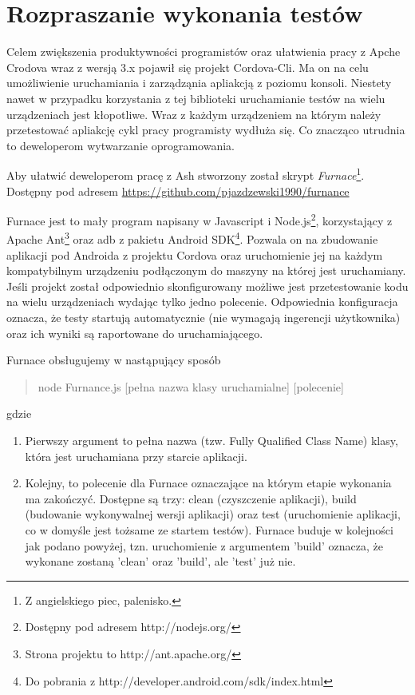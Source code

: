 \documentclass[brudnopis]{xmgr}
\begin{document}
\section{Rozpraszanie wykonania testów}

Celem zwiększenia produktywności programistów oraz ułatwienia pracy z Apche Crodova wraz z wersją 3.x pojawił się projekt Cordova-Cli. Ma on na celu umożliwienie uruchamiania i zarządząnia apliakcją z poziomu konsoli. Niestety nawet w przypadku korzystania z tej biblioteki uruchamianie testów na wielu urządzeniach jest kłopotliwe. Wraz z każdym urządzeniem na którym należy przetestować apliakcję cykl pracy programisty wydłuża się. Co znacząco utrudnia to deweloperom wytwarzanie oprogramowania.

Aby ułatwić deweloperom pracę z Ash stworzony został skrypt \textit{Furnace}\footnote{Z angielskiego piec, palenisko.}. Dostępny pod adresem \url{https://github.com/pjazdzewski1990/furnance}

Furnace jest to mały program napisany w Javascript i Node.js\footnote{Dostępny pod adresem http://nodejs.org/}, korzystający z Apache Ant\footnote{Strona projektu to  http://ant.apache.org/} oraz adb z pakietu Android SDK\footnote{Do pobrania z http://developer.android.com/sdk/index.html}. Pozwala on na zbudowanie aplikacji pod Androida z projektu Cordova oraz uruchomienie jej na każdym kompatybilnym urządzeniu podłączonym do maszyny na której jest uruchamiany. Jeśli projekt został odpowiednio skonfigurowany możliwe jest przetestowanie kodu na wielu urządzeniach wydając tylko jedno polecenie. Odpowiednia konfiguracja oznacza, że testy startują automatycznie (nie wymagają ingerencji użytkownika) oraz ich wyniki są raportowane do uruchamiającego. 

Furnace obsługujemy w nastąpujący sposób

\begin{quote}
	node Furnance.js [pełna nazwa klasy uruchamialne] [polecenie]
\end{quote}

gdzie

\begin{enumerate}
  \item Pierwszy argument to pełna nazwa (tzw. Fully Qualified Class Name) klasy, która jest uruchamiana przy starcie aplikacji. 
  \item Kolejny, to polecenie dla Furnace oznaczające na którym etapie wykonania ma zakończyć. Dostępne są trzy: clean (czyszczenie aplikacji), build (budowanie wykonywalnej wersji aplikacji) oraz test (uruchomienie aplikacji, co w domyśle jest tożsame ze startem testów). Furnace buduje w kolejności jak podano powyżej, tzn. uruchomienie z argumentem 'build' oznacza, że wykonane zostaną 'clean' oraz 'build', ale 'test' już nie.
\end{enumerate}
\end{document}
